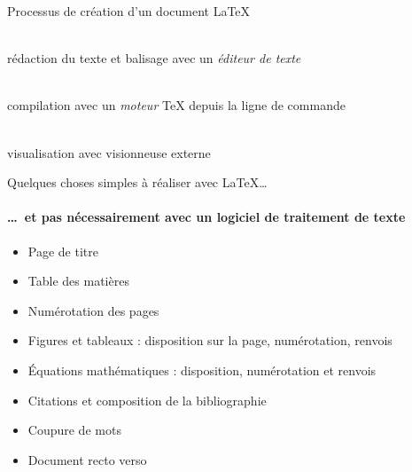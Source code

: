 \begin{frame}[c]{Processus de création d'un document \LaTeX}
	\Huge
	\begin{minipage}[t]{0.25\linewidth}
		\centering
		\faFileTextO \\ \bigskip
		\footnotesize
		rédaction du texte et balisage avec un \emph{éditeur de texte}
	\end{minipage}
	\hfill\faArrowRight\hfill
	\begin{minipage}[t]{0.25\linewidth}
		\centering
		\faCogs \\  \bigskip
		\footnotesize
		compilation avec un \emph{moteur} {\TeX} depuis la ligne de commande
	\end{minipage}
	\hfill\faArrowRight\hfill
	\begin{minipage}[t]{0.25\linewidth}
		\centering
		\faFilePdfO \\  \bigskip
		\footnotesize
		visualisation avec visionneuse externe
	\end{minipage}
\end{frame}

\begin{frame}{Quelques choses simples à réaliser avec \LaTeX\ldots}
	\framesubtitle{\ldots\ et pas nécessairement avec un logiciel de traitement de texte}
	
	\begin{itemize}
		\item Page de titre
		\item Table des matières
		\item Numérotation des pages
		\item Figures et tableaux : disposition sur la page, numérotation, renvois
		\item Équations mathématiques : disposition, numérotation et renvois
		\item Citations et composition de la bibliographie
		\item Coupure de mots
		\item Document recto verso
	\end{itemize}
\end{frame}

